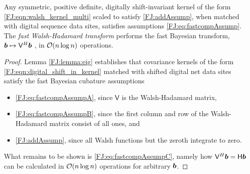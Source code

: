 \documentclass[graybox,footinfo]{svmult}
\begin{document}
\begin{theorem} \label{FJ:thm:main}
	Any symmetric, positive definite, digitally shift-invariant kernel of the form \eqref{FJ:eqn:walsh_kernel_multi} scaled to satisfy \eqref{FJ:addAssump}, when matched with digital sequence data sites, satisfies assumptions \eqref{FJ:eq:fastcompAssump}.  The \emph{fast Walsh-Hadamard transform} performs the fast Bayesian transform,  ${\boldsymbol{b}} \mapsto \mathsf{V}^H {\boldsymbol{b}}$ , in ${\mathcal{O}}(n \log n)$ operations.
\end{theorem}

\begin{proof}{
Lemma \ref{FJ:lemma:eig} establishes that covariance kernels of the form \eqref{FJ:eqn:digital_shift_in_kernel} matched with shifted digital net data sites satisfy the fast Bayesian cubature assumptions
\begin{itemize}
    \item \eqref{FJ:eq:fastcompAssumpA}, since $\mathsf{V}$ is the Walsh-Hadamard matrix,
    
    \item  \eqref{FJ:eq:fastcompAssumpB}, since the first column and row of the  Walsh-Hadamard matrix consist of all ones, and
    
    \item \eqref{FJ:addAssump}, since all Walsh functions but the zeroth integrate to zero.
\end{itemize}
What remains to be shown is \eqref{FJ:eq:fastcompAssumpC}, namely how $\mathsf{V}^H {\boldsymbol{b}} = \mathsf{H} {\boldsymbol{b}}$ can be calculated in ${\mathcal{O}}(n \log{n})$ operations for arbitrary ${\boldsymbol{b}}$.

}
\end{proof}
\end{document}
